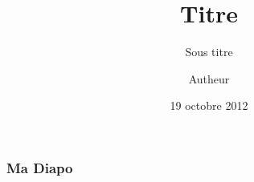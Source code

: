 \documentclass{beamer}
\title[]{Titre}
\subtitle{Sous titre}
\author[Equipe Autheur]{Autheur}
\institute[E.O.L.E]{\texttt{[image: img/logo-eole.png]}}
\date{{\small 19 octobre 2012}}
\begin{document}
    \begin{frame}
        \titlepage
    \end{frame}

    \begin{frame}
        \frametitle{Ma Diapo}
    \end{frame}
\end{document}
